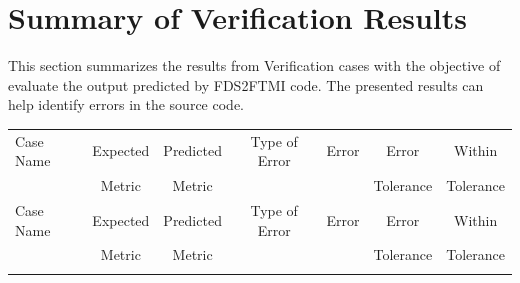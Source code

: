 \documentclass[11pt]{book}
\begin{document}
\section{Summary of Verification Results}

This section summarizes the results from Verification cases with the objective of evaluate the output predicted by FDS2FTMI code. The presented results can help identify errors in the source code.

\begin{longtable}[c]{l c c c c c c }
\hline
Case Name & Expected & Predicted & Type of Error & Error & Error     & Within    \\
          & Metric   & Metric    &               &       & Tolerance & Tolerance \\ \hline \hline
\endfirsthead
\hline
Case Name & Expected & Predicted & Type of Error & Error & Error     & Within    \\
          & Metric   & Metric    &               &       & Tolerance & Tolerance \\ \hline \hline
\endhead
\hline
\endfoot
\hline
\endlastfoot

\end{longtable}

\printbibliography
\end{document}
